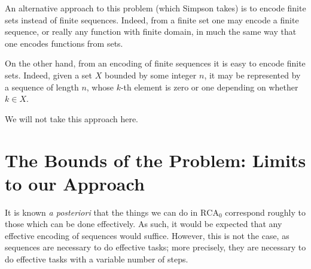 \documentclass{article}
\theoremstyle{nonumberplain}
\newcommand{\RCA}{\mathrm{RCA}}
\begin{document}
An alternative approach to this problem (which Simpson takes) is to encode finite sets instead of finite sequences. Indeed, from a finite set one may encode a finite sequence, or really any function with finite domain, in much the same way that one encodes functions from sets.

On the other hand, from an encoding of finite sequences it is easy to encode finite sets. Indeed, given a set $X$ bounded by some integer $n$, it may be represented by a sequence of length $n$, whose $k$-th element is zero or one depending on whether $k \in X$.

We will not take this approach here.

\section{The Bounds of the Problem: Limits to our Approach}\label{sec:bounds}

It is known \textit{a posteriori} that the things we can do in $\RCA_0$ correspond roughly to those which can be done effectively. As such, it would be expected that any effective encoding of sequences would suffice. However, this is not the case, as sequences are necessary to do effective tasks; more precisely, they are necessary to do effective tasks with a variable number of steps.
\end{document}
